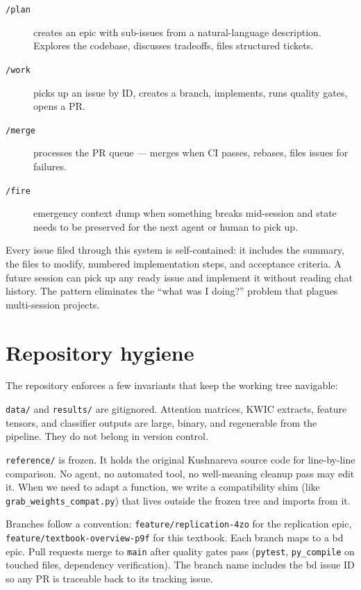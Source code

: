 \begin{description}
\item[\texttt{/plan}] creates an epic with sub-issues from a natural-language description. Explores the codebase, discusses tradeoffs, files structured tickets.
\item[\texttt{/work}] picks up an issue by ID, creates a branch, implements, runs quality gates, opens a PR.
\item[\texttt{/merge}] processes the PR queue --- merges when CI passes, rebases, files issues for failures.
\item[\texttt{/fire}] emergency context dump when something breaks mid-session and state needs to be preserved for the next agent or human to pick up.
\end{description}

Every issue filed through this system is self-contained: it includes the summary, the files to modify, numbered implementation steps, and acceptance criteria. A future session can pick up any ready issue and implement it without reading chat history. The pattern eliminates the ``what was I doing?'' problem that plagues multi-session projects.

\section{Repository hygiene}

The repository enforces a few invariants that keep the working tree navigable:

\texttt{data/} and \texttt{results/} are gitignored. Attention matrices, KWIC extracts, feature tensors, and classifier outputs are large, binary, and regenerable from the pipeline. They do not belong in version control.

\texttt{reference/} is frozen. It holds the original Kushnareva source code for line-by-line comparison. No agent, no automated tool, no well-meaning cleanup pass may edit it. When we need to adapt a function, we write a compatibility shim (like \texttt{grab\_weights\_compat.py}) that lives outside the frozen tree and imports from it.

Branches follow a convention: \texttt{feature/replication-4zo} for the replication epic, \texttt{feature/textbook-overview-p9f} for this textbook. Each branch maps to a bd epic. Pull requests merge to \texttt{main} after quality gates pass (\texttt{pytest}, \texttt{py\_compile} on touched files, dependency verification). The branch name includes the bd issue ID so any PR is traceable back to its tracking issue.

